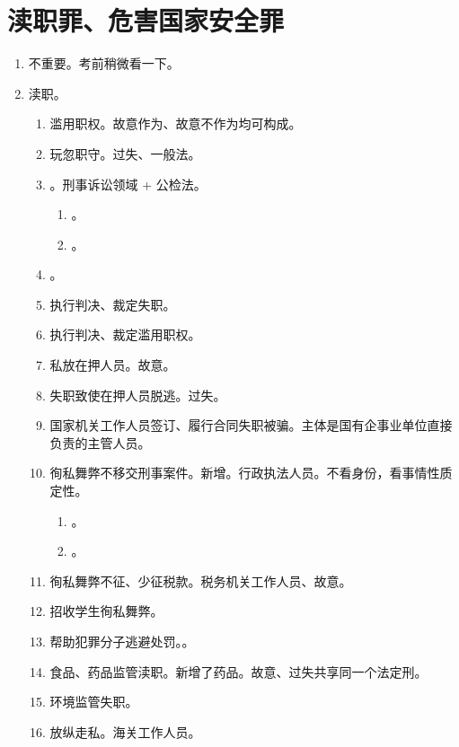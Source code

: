 \section{渎职罪、危害国家安全罪}
\begin{enumerate}
  \item 不重要。考前稍微看一下。
  \item 渎职。
        \begin{enumerate}
          \item 滥用职权。故意作为、故意不作为均可构成。
          \item 玩忽职守。过失、一般法。
          \item {}。刑事诉讼领域 + 公检法。
                \begin{enumerate}
                  \item {}。
                  \item {}。
                \end{enumerate}
          \item {}。
          \item 执行判决、裁定失职。
          \item 执行判决、裁定滥用职权。
          \item 私放在押人员。故意。
          \item 失职致使在押人员脱逃。过失。
          \item 国家机关工作人员签订、履行合同失职被骗。主体是国有企事业单位直接负责的主管人员。
          \item 徇私舞弊不移交刑事案件。新增。行政执法人员。不看身份，看事情性质定性。
                \begin{enumerate}
                  \item {}。
                  \item {}。
                \end{enumerate}
          \item 徇私舞弊不征、少征税款。税务机关工作人员、故意。
          \item 招收学生徇私舞弊。
          \item 帮助犯罪分子逃避处罚。。
          \item 食品、药品监管渎职。新增了药品。故意、过失共享同一个法定刑。
          \item 环境监管失职。
          \item 放纵走私。海关工作人员。

\end{enumerate}
\end{enumerate}
